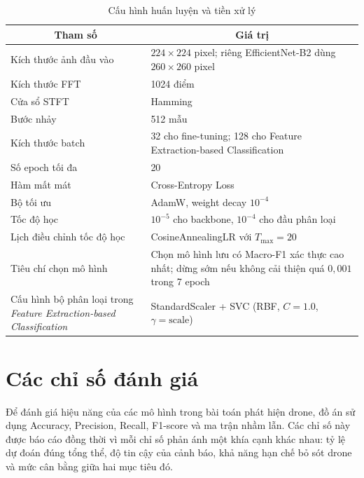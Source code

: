 \documentclass[../DoAn.tex]{subfiles}
\begin{document}
\begin{table}[H]
    \centering
    \renewcommand{\arraystretch}{1.3}
    \small
    \begin{tabular}{|p{}|p{}|}
        \hline
        \multicolumn{1}{|c|}{\textbf{Tham số}} & \multicolumn{1}{c|}{\textbf{Giá trị}} \\ \hline
        Kích thước ảnh đầu vào & $224 \times 224$ pixel; riêng EfficientNet-B2 dùng $260 \times 260$ pixel\\ \hline
        Kích thước FFT & 1024 điểm \\ \hline
        Cửa sổ STFT & Hamming \\ \hline
        Bước nhảy & 512 mẫu \\ \hline
        Kích thước batch & 32 cho fine-tuning; 128 cho Feature Extraction-based Classification \\ \hline
        Số epoch tối đa & 20 \\ \hline
        Hàm mất mát & Cross-Entropy Loss\\ \hline
        Bộ tối ưu & AdamW, weight decay $10^{-4}$ \\ \hline
        Tốc độ học & $10^{-5}$ cho backbone, $10^{-4}$ cho đầu phân loại \\ \hline
        Lịch điều chỉnh tốc độ học & CosineAnnealingLR với $T_{\max}=20$ \\ \hline
        Tiêu chí chọn mô hình & Chọn mô hình lưu có Macro-F1 xác thực cao nhất; dừng sớm nếu không cải thiện quá $0{,}001$ trong 7 epoch \\ \hline
        Cấu hình bộ phân loại trong \textit{Feature Extraction-based Classification} & StandardScaler + SVC (RBF, $C=1.0$, $\gamma=\mathrm{scale}$) \\ \hline
    \end{tabular}
    \caption{Cấu hình huấn luyện và tiền xử lý}
    \label{tab:training_configuration}

\end{table}

\section{Các chỉ số đánh giá}

Để đánh giá hiệu năng của các mô hình trong bài toán phát hiện drone, đồ án sử dụng Accuracy, Precision, Recall, F1-score và ma trận nhầm lẫn. Các chỉ số này được báo cáo đồng thời vì mỗi chỉ số phản ánh một khía cạnh khác nhau: tỷ lệ dự đoán đúng tổng thể, độ tin cậy của cảnh báo, khả năng hạn chế bỏ sót drone và mức cân bằng giữa hai mục tiêu đó.
\end{document}
